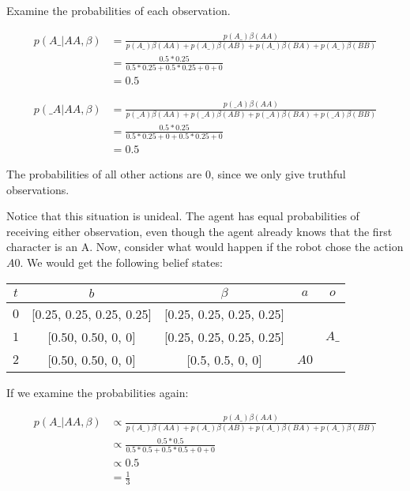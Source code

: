 \documentclass{article}
\begin{document}
Examine the probabilities of each observation.

\begin{align*}
	p(A\_ | AA, \beta) &= \frac{ p(A\_)\beta(AA) }{ p(A\_)\beta(AA) + p(A\_)\beta(AB) + p(A\_)\beta(BA) + p(A\_)\beta(BB)} \\
	&= \frac{0.5 * 0.25}{0.5 * 0.25 + 0.5 * 0.25 + 0 + 0} \\
	&= 0.5
\end{align*}

\begin{align*}
	p(\_A | AA, \beta) &= \frac{ p(\_A)\beta(AA) }{ p(\_A)\beta(AA) + p(\_A)\beta(AB) + p(\_A)\beta(BA) + p(\_A)\beta(BB)} \\
	&= \frac{0.5 * 0.25}{0.5 * 0.25 + 0 + 0.5 * 0.25 + 0} \\
	&= 0.5
\end{align*}

The probabilities of all other actions are 0, since we only give truthful observations.

Notice that this situation is unideal. The agent has equal probabilities of receiving either observation, even though the agent already knows that the first character is an A. Now, consider what would happen if the robot chose the action $A0$. We would get the following belief states: 


\begin{center}
\begin{tabular}{|c| c| c| c | c|}
	\hline
	$t$ & $b$ & $\beta$ & $a$ & $o$ \\
	\hline
	$0$ & [0.25, 0.25, 0.25, 0.25] & [0.25, 0.25, 0.25, 0.25] & & \\
	\hline
	$1$ & [0.50, 0.50, 0, 0] & [0.25, 0.25, 0.25, 0.25] & & $A\_$ \\
	\hline
	$2$ & [0.50, 0.50, 0, 0] & [0.5, 0.5, 0, 0] & $A0$  &  \\
	\hline
\end{tabular}
\end{center}

If we examine the probabilities again: 

\begin{align*}
	p(A\_|AA, \beta) &\propto \frac{ p(A\_)\beta(AA) }{ p(A\_)\beta(AA) + p(A\_)\beta(AB) + p(A\_)\beta(BA) + p(A\_)\beta(BB)} \\
	&\propto \frac{0.5 * 0.5}{0.5 * 0.5 + 0.5 * 0.5 + 0 + 0} \\
	&\propto 0.5 \\
	&= \frac{1}{3}
\end{align*}
\end{document}
